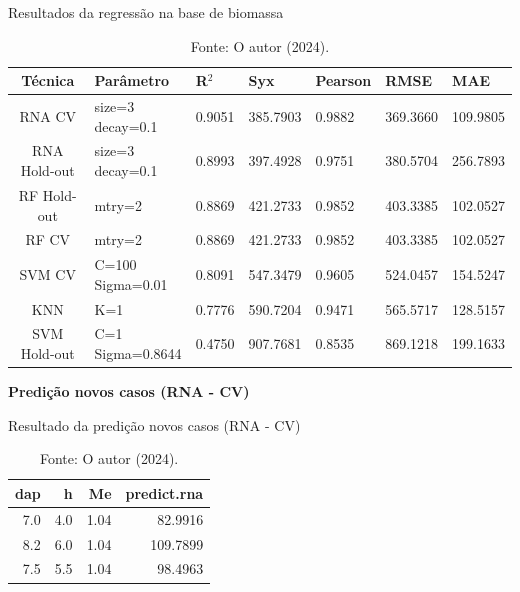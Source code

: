 \begin{table}[H]
\caption{Resultados da regressão na base de biomassa}
\hspace*{-1.5cm} 
\begin{minipage}{\textwidth}
\centering
{\renewcommand{\arraystretch}{1.7} %

\begin{tabular}{|c|p{3cm}|p{2cm}|p{2cm}|p{2cm}|p{2cm}|p{2cm}|}
\hline
\textbf{Técnica} & \textbf{Parâmetro} & \textbf{R$^2$} & \textbf{Syx} & \textbf{Pearson} & \textbf{RMSE} & \textbf{MAE} \\
\hline
\colorbox[HTML]{CAF2C2}{RNA CV} & \makecell[l]{size=3\\decay=0.1} & \colorbox[HTML]{CAF2C2}{0.9051} & \colorbox[HTML]{CAF2C2}{385.7903} & \colorbox[HTML]{CAF2C2}{0.9882} & \colorbox[HTML]{CAF2C2}{369.3660} & 109.9805 \\
\hline
RNA Hold-out & \makecell[l]{size=3\\decay=0.1} & 0.8993 & 397.4928 & 0.9751 & 380.5704 & 256.7893 \\
\hline
RF Hold-out & mtry=2 & 0.8869 & 421.2733 & 0.9852 & 403.3385 & \colorbox[HTML]{CAF2C2}{102.0527} \\
\hline
RF CV & mtry=2 & 0.8869 & 421.2733 & 0.9852 & 403.3385 & \colorbox[HTML]{CAF2C2}{102.0527} \\
\hline
SVM CV & \makecell[l]{C=100\\Sigma=0.01} & 0.8091 & 547.3479 & 0.9605 & 524.0457 & 154.5247 \\
\hline
KNN & K=1 & 0.7776 & 590.7204 & 0.9471 & 565.5717 & 128.5157 \\
\hline
SVM Hold-out & \makecell[l]{C=1\\Sigma=0.8644} & 0.4750 & 907.7681 & 0.8535 & 869.1218 & 199.1633 \\
\hline
\end{tabular}
}
\end{minipage}
\caption*{Fonte: O autor (2024).}
\end{table}



\begin{center}
    \textbf{Predição novos casos (RNA - CV)}
\end{center}

\begin{table}[H]
\centering
\caption{Resultado da predição novos casos (RNA - CV)}
\begin{tabular}{|r|r|r|r|}
\hline
dap & h & Me & predict.rna \\
\hline
7.0 & 4.0 & 1.04 & 82.9916 \\
\hline
8.2 & 6.0 & 1.04 & 109.7899 \\
\hline
7.5 & 5.5 & 1.04 & 98.4963 \\
\hline
\end{tabular}
\caption*{Fonte: O autor (2024).}
\end{table}


